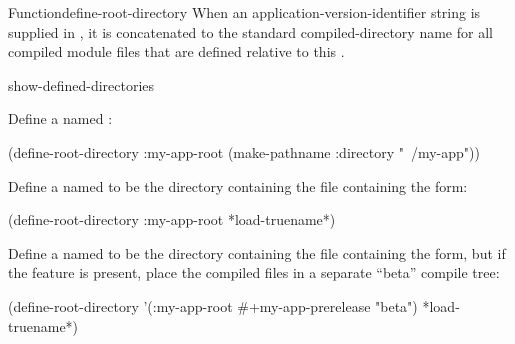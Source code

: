 \documentclass[10pt,twoside,english,pdftex]{article}
\begin{document}
\begin{functiondoc}{Function}{define-root-directory}
When an application-version-identifier string is supplied in
, it is concatenated to the standard
 compiled-directory name for all compiled module
files that are defined relative to this .

\begin{alsos}{show-defined-directories}
\end{alsos}

\fnexamples Define a  named :
%
\W\supp
\begin{example}
  (define-root-directory :my-app-root 
    (make-pathname :directory "~/my-app"))
\end{example}
%
Define a  named  to be the
directory containing the file containing the
 form:
%
\W\supp\notpretop
\begin{example}
  (define-root-directory :my-app-root *load-truename*)
\end{example}
%
Define a  named  to be the
directory containing the file containing the
 form, but if the
 feature is present, place the compiled files
in a separate ``beta'' compile tree:
%
\W\supp\notpretop
\begin{example}
  (define-root-directory '(:my-app-root #+my-app-prerelease "beta")
    *load-truename*)
\end{example}

\end{functiondoc}

\end{document}
